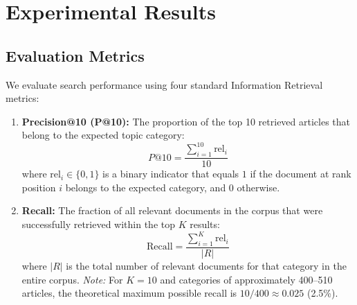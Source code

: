 \documentclass[11pt,a4paper]{article}
\begin{document}
\newpage

\section{Experimental Results}

\subsection{Evaluation Metrics}
We evaluate search performance using four standard Information Retrieval metrics:
\begin{enumerate}[label=\textbf{\arabic*.}]
    \item \textbf{Precision@10 (P@10):} The proportion of the top 10 retrieved articles that belong to the expected topic category:
    \begin{equation}
    P@10 = \frac{\sum_{i=1}^{10} \text{rel}_i}{10}
    \end{equation}
    where $\text{rel}_i \in \{0, 1\}$ is a binary indicator that equals $1$ if the document at rank position $i$ belongs to the expected category, and $0$ otherwise.

    \item \textbf{Recall:} The fraction of all relevant documents in the corpus that were successfully retrieved within the top $K$ results:
    \begin{equation}
    \text{Recall} = \frac{\sum_{i=1}^{K} \text{rel}_i}{|R|}
    \end{equation}
    where $|R|$ is the total number of relevant documents for that category in the entire corpus. \textit{Note:} For $K=10$ and categories of approximately 400--510 articles, the theoretical maximum possible recall is $10/400 \approx 0.025$ (2.5\%).


\end{enumerate}
\end{document}
